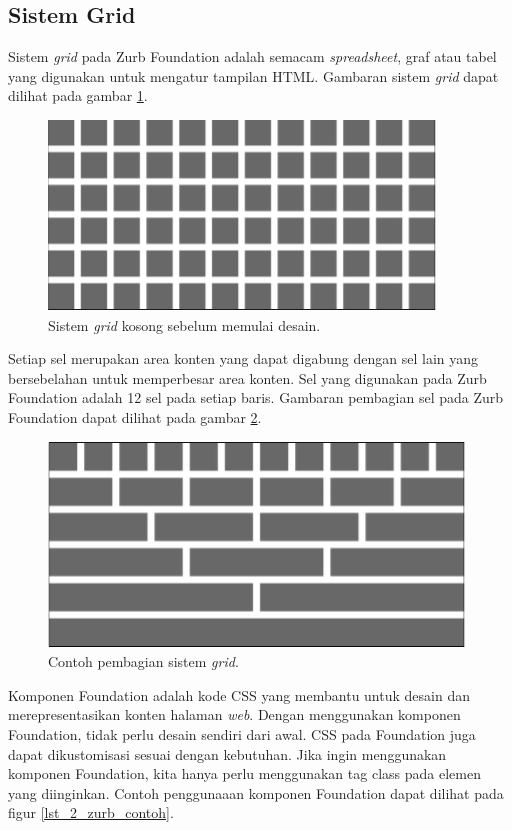 \subsection{Sistem Grid}
Sistem \textit{grid} pada Zurb Foundation adalah semacam \textit{spreadsheet}, graf atau tabel yang digunakan untuk mengatur tampilan HTML. Gambaran sistem \textit{grid} dapat dilihat pada gambar \ref{fig:2_zurb_grid_blank}.

\begin{figure}[H]
	\centering
	\includegraphics[scale=0.5]{Gambar/zurb-gridblank}
	\caption{Sistem \textit{grid} kosong sebelum memulai desain.} 
	\label{fig:2_zurb_grid_blank}
\end{figure}

Setiap sel merupakan area konten yang dapat digabung dengan sel lain yang bersebelahan untuk memperbesar area konten. Sel yang digunakan pada Zurb Foundation adalah 12 sel pada setiap baris. Gambaran pembagian sel pada Zurb Foundation dapat dilihat pada gambar \ref{fig:2_zurb_grid}.

\begin{figure}[H]
	\centering
	\includegraphics[scale=0.5]{Gambar/zurb-grid}
	\caption{Contoh pembagian sistem \textit{grid}.} 
	\label{fig:2_zurb_grid}
\end{figure}

Komponen Foundation adalah kode CSS  yang membantu untuk desain dan merepresentasikan konten halaman \textit{web}. Dengan menggunakan komponen Foundation, tidak perlu desain sendiri dari awal. CSS pada Foundation juga dapat dikustomisasi sesuai dengan kebutuhan. Jika ingin menggunakan komponen Foundation, kita hanya perlu menggunakan tag class pada elemen yang diinginkan. Contoh penggunaaan komponen Foundation dapat dilihat pada figur \ref{lst_2_zurb_contoh}.

